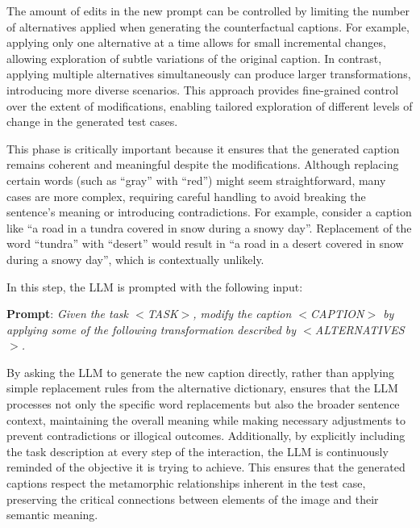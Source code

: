 The amount of edits in the new prompt can be controlled by limiting the number of alternatives applied when generating the counterfactual captions. For example, applying only one alternative at a time allows for small incremental changes, allowing exploration of subtle variations of the original caption. In contrast, applying multiple alternatives simultaneously can produce larger transformations, introducing more diverse scenarios. This approach provides fine-grained control over the extent of modifications, enabling tailored exploration of different levels of change in the generated test cases.

This phase is critically important because it ensures that the generated caption remains coherent and meaningful despite the modifications. Although replacing certain words (such as ``gray'' with ``red'') might seem straightforward, many cases are more complex, requiring careful handling to avoid breaking the sentence's meaning or introducing contradictions. For example, consider a caption like ``a road in a tundra covered in snow during a snowy day''. Replacement of the word ``tundra'' with ``desert'' would result in ``a road in a desert covered in snow during a snowy day'', which is contextually unlikely.

In this step, the LLM is prompted with the following input:

\begin{tcolorbox}[arc=.3em,left=.3em,right=.3em,top=.3em,bottom=.3em]
\begin{center}
\begin{minipage}[t]{.99\linewidth}
\textbf{Prompt}: \textit{
Given the task $<$TASK$>$, modify the caption $<$CAPTION$>$ by applying some of the following transformation described by $<$ALTERNATIVES$>$.
}
\end{minipage}
\end{center}
\end{tcolorbox}

By asking the LLM to generate the new caption directly, rather than applying simple replacement rules from the alternative dictionary, \approach ensures that the LLM processes not only the specific word replacements but also the broader sentence context, maintaining the overall meaning while making necessary adjustments to prevent contradictions or illogical outcomes.
Additionally, by explicitly including the task description at every step of the interaction, the LLM is continuously reminded of the objective it is trying to achieve. This ensures that the generated captions respect the metamorphic relationships inherent in the test case, preserving the critical connections between elements of the image and their semantic meaning.

